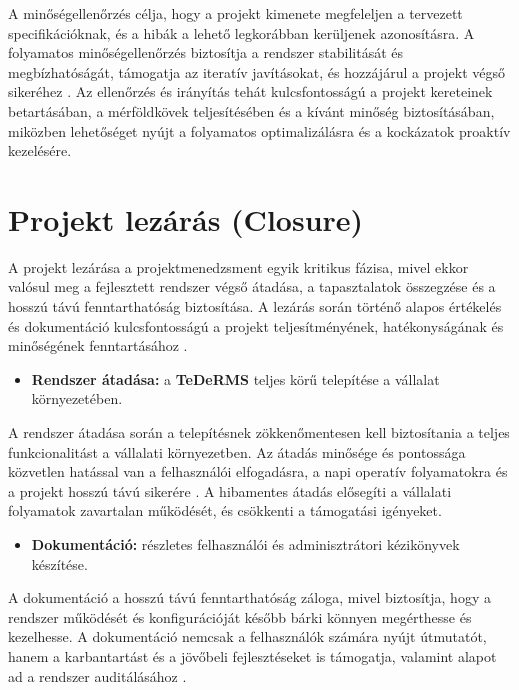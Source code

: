 A minőségellenőrzés célja, hogy a projekt kimenete megfeleljen a tervezett specifikációknak, és a hibák a lehető 
legkorábban kerüljenek azonosításra. A folyamatos minőségellenőrzés biztosítja a rendszer 
stabilitását és megbízhatóságát, támogatja az iteratív javításokat, és hozzájárul a projekt végső sikeréhez \cite{Kovacs2016,Kaposi2019,Szalay2018}.
Az ellenőrzés és irányítás tehát kulcsfontosságú a projekt kereteinek betartásában, a mérföldkövek teljesítésében és a 
kívánt minőség biztosításában, miközben lehetőséget nyújt a folyamatos optimalizálásra és a kockázatok proaktív kezelésére.


\section{Projekt lezárás (Closure)}

A projekt lezárása a projektmenedzsment egyik kritikus fázisa, mivel ekkor valósul meg a fejlesztett 
rendszer végső átadása, a tapasztalatok összegzése és a hosszú távú fenntarthatóság biztosítása. 
A lezárás során történő alapos értékelés és dokumentáció 
kulcsfontosságú a projekt teljesítményének, hatékonyságának és minőségének fenntartásához \cite{Hajdu2014,Szalay2018,Kovacs2016,Kaposi2019}.

\begin{itemize}
    \item \textbf{Rendszer átadása:} a \textbf{TeDeRMS} teljes körű telepítése a vállalat környezetében.
\end{itemize}

A rendszer átadása során a telepítésnek zökkenőmentesen kell biztosítania a teljes funkcionalitást a 
vállalati környezetben. Az átadás minősége és pontossága közvetlen hatással 
van a felhasználói elfogadásra, a napi operatív folyamatokra és a projekt hosszú távú sikerére \cite{Szalay2018,Kovacs2016}. 
A hibamentes átadás elősegíti a vállalati folyamatok zavartalan működését, és csökkenti a támogatási igényeket.

\begin{itemize}
    \item \textbf{Dokumentáció:} részletes felhasználói és adminisztrátori kézikönyvek készítése.
\end{itemize}

A dokumentáció a hosszú távú fenntarthatóság záloga, mivel biztosítja, hogy a rendszer működését és 
konfigurációját később bárki könnyen megérthesse és kezelhesse. 
A dokumentáció nemcsak a felhasználók számára nyújt útmutatót, hanem a 
karbantartást és a jövőbeli fejlesztéseket is támogatja, valamint alapot ad a rendszer auditálásához \cite{Hajdu2014,Kaposi2019}.

